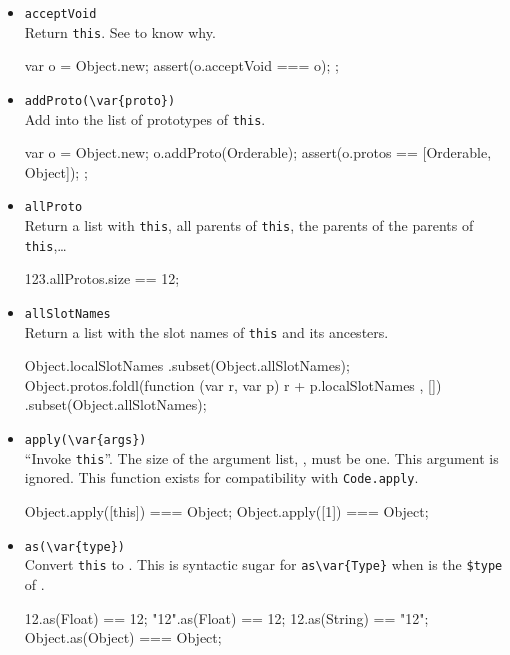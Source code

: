 \begin{itemize}
\item \lstinline|acceptVoid|\\
  Return \lstinline|this|.  See  to know why.
\begin{urbiscript}
{
  var o = Object.new;
  assert(o.acceptVoid === o);
};
\end{urbiscript}


\item \lstinline|addProto(\var{proto})|\\
  Add  into the list of prototypes of \lstinline|this|.
\begin{urbiscript}
{
  var o = Object.new;
  o.addProto(Orderable);
  assert(o.protos == [Orderable, Object]);
};
\end{urbiscript}

\item \lstinline|allProto|\\
  Return a list with \lstinline|this|, all parents of
  \lstinline|this|, the parents of the parents of
  \lstinline|this|,\ldots
\begin{urbiassert}
123.allProtos.size == 12;
\end{urbiassert}

\item \lstinline|allSlotNames|\\
  Return a list with the slot names of \lstinline|this| and its
  ancesters.
\begin{urbiassert}
Object.localSlotNames
  .subset(Object.allSlotNames);
Object.protos.foldl(function (var r, var p) { r + p.localSlotNames },
                    [])
  .subset(Object.allSlotNames);
\end{urbiassert}

\item \lstinline|apply(\var{args})|\\
  ``Invoke \lstinline|this|''.  The size of the argument list,
  , must be one.  This argument is ignored.  This function
  exists for compatibility with \lstinline|Code.apply|.
\begin{urbiassert}
Object.apply([this]) === Object;
Object.apply([1])    === Object;
\end{urbiassert}

\item \lstinline|as(\var{type})|\\
  Convert \lstinline|this| to .  This is syntactic sugar for
  \lstinline|as\var{Type}| when  is the \lstinline|$type| of
  .
\begin{urbiassert}
12.as(Float) == 12;
"12".as(Float) == 12;
12.as(String) == "12";
Object.as(Object) === Object;
\end{urbiassert}


\end{itemize}
